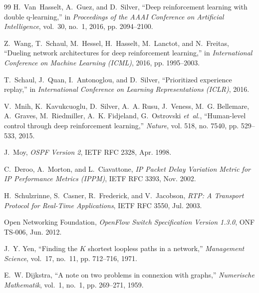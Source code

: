 \documentclass[12pt,a4paper,oneside]{report}
\begin{document}



\begin{thebibliography}{99}
H.~Van~Hasselt, A.~Guez, and D.~Silver, ``Deep reinforcement learning with double q-learning,'' in \emph{Proceedings of the AAAI Conference on Artificial Intelligence}, vol.~30, no.~1, 2016, pp. 2094--2100.

Z.~Wang, T.~Schaul, M.~Hessel, H.~Hasselt, M.~Lanctot, and N.~Freitas, ``Dueling network architectures for deep reinforcement learning,'' in \emph{International Conference on Machine Learning (ICML)}, 2016, pp. 1995--2003.

T.~Schaul, J.~Quan, I.~Antonoglou, and D.~Silver, ``Prioritized experience replay,'' in \emph{International Conference on Learning Representations (ICLR)}, 2016.

V.~Mnih, K.~Kavukcuoglu, D.~Silver, A.~A. Rusu, J.~Veness, M.~G. Bellemare, A.~Graves, M.~Riedmiller, A.~K. Fidjeland, G.~Ostrovski \emph{et~al.}, ``Human-level control through deep reinforcement learning,'' \emph{Nature}, vol. 518, no. 7540, pp. 529--533, 2015.

J.~Moy, \emph{{OSPF Version 2}}, IETF RFC 2328, Apr. 1998.

C.~Deroo, A.~Morton, and L.~Ciavattone, \emph{{IP Packet Delay Variation Metric for IP Performance Metrics (IPPM)}}, IETF RFC 3393, Nov. 2002.

H.~Schulzrinne, S.~Casner, R.~Frederick, and V.~Jacobson, \emph{{RTP: A Transport Protocol for Real-Time Applications}}, IETF RFC 3550, Jul. 2003.

{Open Networking Foundation}, \emph{{OpenFlow Switch Specification Version 1.3.0}}, ONF TS-006, Jun. 2012.

J.~Y. Yen, ``Finding the {$K$} shortest loopless paths in a network,'' \emph{Management Science}, vol.~17, no.~11, pp. 712--716, 1971.

E.~W. Dijkstra, ``A note on two problems in connexion with graphs,'' \emph{Numerische Mathematik}, vol.~1, no.~1, pp. 269--271, 1959.


\end{thebibliography}
\end{document}
